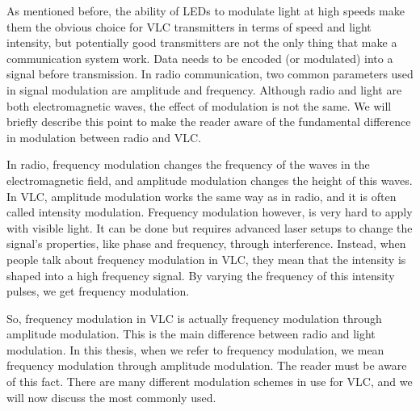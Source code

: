 As mentioned before, the ability of LEDs to modulate light at high speeds make
them the obvious choice for VLC transmitters in terms of speed and light intensity,
but potentially good transmitters are not the only thing that make a communication
system work. Data needs to be encoded (or modulated) into a signal before
transmission.
In radio communication, two common parameters used in signal modulation
are amplitude and frequency. Although radio and light are both electromagnetic
waves, the effect of modulation is not the same. We will briefly describe this point
to make the reader aware of the fundamental difference in modulation between
radio and VLC.

In radio, frequency modulation changes the frequency of the waves in the electromagnetic
field, and amplitude modulation changes the height of this waves.
In VLC, amplitude modulation works the same way as in radio, and it is often
called intensity modulation. Frequency modulation however, is very hard to apply
with visible light. It can be done but requires advanced laser setups to change
the signal’s properties, like phase and frequency, through interference. Instead,
when people talk about frequency modulation in VLC, they mean that the intensity
is shaped into a high frequency signal. By varying the frequency of this intensity
pulses, we get frequency modulation.

So, frequency modulation in VLC is actually frequency modulation through amplitude
modulation. This is the main difference between radio and light modulation.
In this thesis, when we refer to frequency modulation, we mean frequency modulation
through amplitude modulation. The reader must be aware of this fact.
There are many different modulation schemes in use for VLC, and we will now
discuss the most commonly used.

